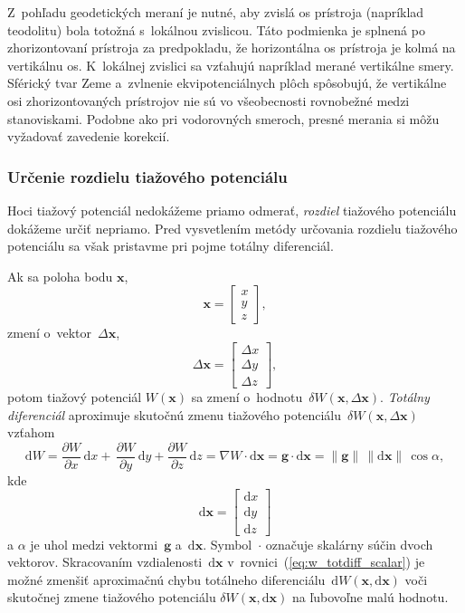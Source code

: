 \documentclass[a4paper,12pt]{book}
\newcommand{\diff}{\mathrm d}
\let\vec\mathbf
\begin{document}
Z~pohľadu geodetických meraní je nutné, aby zvislá os prístroja (napríklad
teodolitu) bola totožná s~lokálnou zvislicou.  Táto podmienka je splnená po
zhorizontovaní prístroja za predpokladu, že horizontálna os prístroja je kolmá
na vertikálnu os.  K~lokálnej zvislici sa vzťahujú napríklad merané
vertikálne smery.  Sférický tvar Zeme a~zvlnenie ekvipotenciálnych plôch
spôsobujú, že vertikálne osi zhorizontovaných prístrojov nie sú vo všeobecnosti
rovnobežné medzi stanoviskami.  Podobne ako pri vodorovných smeroch, presné
merania si môžu vyžadovať zavedenie korekcií.

\subsubsection{Určenie rozdielu tiažového potenciálu}

Hoci tiažový potenciál nedokážeme priamo odmerať, \emph{rozdiel} tiažového 
potenciálu dokážeme určiť nepriamo.  Pred vysvetlením metódy určovania rozdielu 
tiažového potenciálu sa však pristavme pri pojme totálny diferenciál.

Ak sa poloha bodu $\vec x$,
%
\begin{equation}
\vec x =
\begin{bmatrix}
x\\
y\\
z
\end{bmatrix}
{,}
\end{equation}
%
zmení o~vektor~$\Delta \vec x$,
%
\begin{equation}
\label{eq:deltax}
\Delta \vec x =
\begin{bmatrix}
\Delta x\\
\Delta y\\
\Delta z
\end{bmatrix}
{,}
\end{equation}
%
potom tiažový potenciál $W(\vec x)$ sa zmení o~hodnotu~$\delta W(\vec x, \Delta 
\vec x)$.  \emph{Totálny diferenciál} aproximuje skutočnú zmenu tiažového 
potenciálu~$\delta W(\vec x, \Delta \vec x)$ vzťahom
%
\begin{equation}
\label{eq:w_totdiff_scalar}
\diff W = \frac{\partial W}{\partial x} \, \diff x + \, \frac{\partial 
W}{\partial y} \, \diff y + \frac{\partial W}{\partial z} \, \diff z = \nabla 
W \cdot \diff \vec x = \vec g \cdot \diff \vec x = \| \vec g \| \, \| \diff 
\vec x \| \, \cos\alpha{,}
\end{equation}
%
kde
%
\begin{equation}
\label{eq:diffx}
\diff \vec x =
\begin{bmatrix}
\diff x\\
\diff y\\
\diff z
\end{bmatrix}
\end{equation}
%
a $\alpha$ je uhol medzi vektormi~$\vec g$ a~$\diff \vec x$.  Symbol~$\cdot$ 
označuje skalárny súčin dvoch vektorov.  Skracovaním vzdialenosti~$\diff \vec 
x$ v~rovnici~(\ref{eq:w_totdiff_scalar}) je možné zmenšiť aproximačnú chybu 
totálneho diferenciálu~$\diff W(\vec x, \diff \vec x)$ voči skutočnej zmene 
tiažového potenciálu $\delta W(\vec x, \diff \vec x)$ na ľubovoľne malú 
hodnotu.
\end{document}
